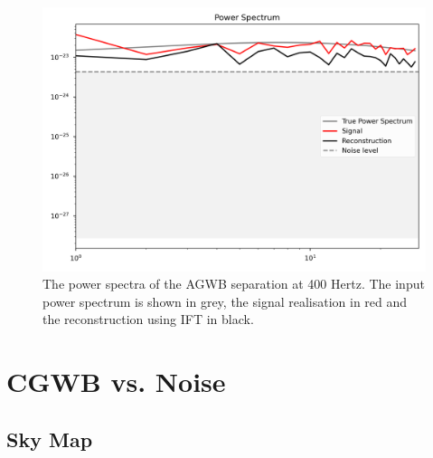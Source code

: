 \begin{figure}[h]
    \centering
    \includegraphics[width=0.8\linewidth]{Images/power_spectrum_400Hz_2D.png}
    \caption{The power spectra of the AGWB separation at 400 Hertz. The input power spectrum is shown in grey, the signal realisation in red and the reconstruction using IFT in black.}
    \label{400Hz_power_spectrum}
\end{figure} 

\section{CGWB vs. Noise}
\subsection{Sky Map}

